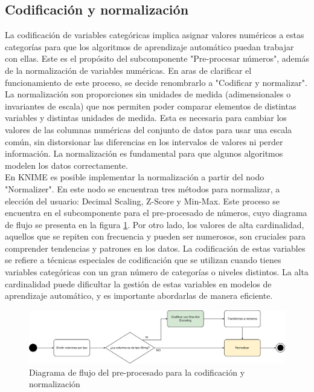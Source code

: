 \subsection{Codificación y normalización}
La codificación de variables categóricas implica asignar valores numéricos a estas categorías para que los algoritmos de aprendizaje automático puedan trabajar con ellas. Este es el propósito del subcomponente "Pre-procesar números", además de la normalización de variables numéricas. En aras de clarificar el funcionamiento de este proceso, se decide renombrarlo a "Codificar y normalizar".\\
La normalización son proporciones sin unidades de medida (adimensionales o invariantes de escala) que nos permiten poder comparar elementos de distintas variables y distintas unidades de medida. Esta es necesaria para cambiar los valores de las columnas numéricas del conjunto de datos para usar una escala común, sin distorsionar las diferencias en los intervalos de valores ni perder información. La normalización es fundamental para que algunos algoritmos modelen los datos correctamente. \\
En KNIME es posible implementar la normalización a partir del nodo "Normalizer". En este nodo se encuentran tres métodos para normalizar, a elección del usuario: Decimal Scaling, Z-Score y Min-Max. Este proceso se encuentra en el subcomponente para el pre-procesado de números, cuyo diagrama de flujo se presenta en la figura \ref{fig:number-preprocs}.
Por otro lado, los valores de alta cardinalidad, aquellos que se repiten con frecuencia y pueden ser numerosos, son cruciales para comprender tendencias y patrones en los datos. La codificación de estas variables se refiere a técnicas especiales de codificación que se utilizan cuando tienes variables categóricas con un gran número de categorías o niveles distintos. La alta cardinalidad puede dificultar la gestión de estas variables en modelos de aprendizaje automático, y es importante abordarlas de manera eficiente. \\

\begin{figure}[H]
	\centering
	\includegraphics[width=1\linewidth]{"figuras/capi 2/preprocesado/number preprocs.drawio"}
	\caption{Diagrama de flujo del pre-procesado para la codificación y normalización}
	\label{fig:number-preprocs}
\end{figure}

